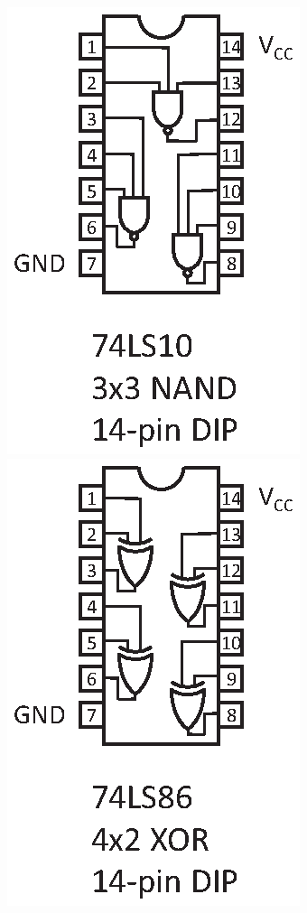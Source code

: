 \hspace{0.25in}
\includegraphics[scale=0.8]{appendices/pinouts/74LS10_pinout.eps}
\includegraphics[scale=0.8]{appendices/pinouts/74LS86_pinout.eps}


